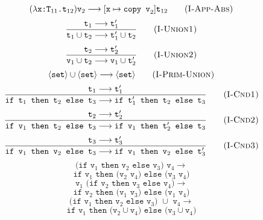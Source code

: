 \documentclass[a4paper]{article}
\begin{document}
\begin{equation}
	(\lambda\text{\tt x:T$_{11}$.t$_{12}$})\text{\tt v}_2\longrightarrow[\text{\tt x}\mapsto\text{\tt copy v}_2]\text{\tt t}_{12}\tag{\sc I-App-Abs}
\end{equation}
\begin{equation}
	\frac{\text{\tt t}_1\longrightarrow\text{\tt t}^{\prime}_1}
	{\text{\tt t}_1\cup\text{\tt t}_2 \longrightarrow \text{\tt t}^{\prime}_1\cup\text{\tt t}_2}
	\tag{\sc I-Union1}
\end{equation}
\begin{equation}
	\frac{\text{\tt t}_2\longrightarrow\text{\tt t}^{\prime}_2}
	{\text{\tt v}_1\cup\text{\tt t}_2 \longrightarrow \text{\tt v}_1\cup\text{\tt t}^{\prime}_2}
	\tag{\sc I-Union2}
\end{equation}
\begin{equation}
	\langle\text{\tt set}\rangle\cup\langle\text{\tt set}\rangle \longrightarrow\langle\text{\tt set}\rangle
	\tag{\sc I-Prim-Union}
\end{equation}
\begin{equation}
	\frac{\text{\tt t}_1\longrightarrow\text{\tt t}^{\prime}_1}
	{\text{\tt if t$_1$ then t$_2$ else t$_3$}\longrightarrow
	\text{\tt if t$^\prime_1$ then t$_2$ else t$_3$}}
	\tag{\sc I-Cnd1}
\end{equation}
\begin{equation}
	\frac{\text{\tt t}_2\longrightarrow\text{\tt t}^{\prime}_2}
	{\text{\tt if v$_1$ then t$_2$ else t$_3$}\longrightarrow
	\text{\tt if v$_1$ then t$^\prime_2$ else t$_3$}}
	\tag{\sc I-Cnd2}
\end{equation}
\begin{equation}
	\frac{\text{\tt t}_3\longrightarrow\text{\tt t}^{\prime}_3}
	{\text{\tt if v$_1$ then v$_2$ else t$_3$}\longrightarrow
	\text{\tt if v$_1$ then v$_2$ else t$^\prime_3$}}
	\tag{\sc I-Cnd3}
\end{equation}
$$
	\texttt{(if v$_1$ then v$_2$ else v$_3$) v$_4$}\longrightarrow
$$
\begin{equation}
	\texttt{if v$_1$ then (v$_2$ v$_4$) else (v$_3$ v$_4$)}
	\tag{\sc I-Cnd-App-Simp1}
\end{equation}
$$
	\texttt{v$_1$ (if v$_2$ then v$_3$ else v$_4$)}\longrightarrow
$$
\begin{equation}
	\texttt{if v$_2$ then (v$_1$ v$_3$) else (v$_1$ v$_4$)}
	\tag{\sc I-Cnd-App-Simp2}
\end{equation}
$$
	\texttt{(if v$_1$ then v$_2$ else v$_3$) $\cup$ v$_4$}\longrightarrow
$$
\begin{equation}
	\texttt{if v$_1$ then (v$_2$$\cup$v$_4$) else (v$_3$$\cup$v$_4$)}
	\tag{\sc I-Cnd-Union-Simp1}
\end{equation}
\end{document}
